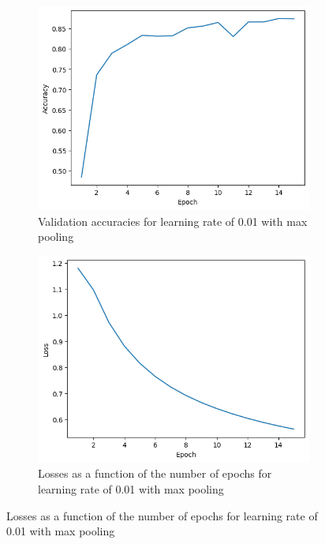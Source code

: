 \documentclass[11pt]{article}
\begin{document}
\begin{figure}[H]
    \hspace{0.025\linewidth}
    \begin{subfigure}{0.45\linewidth}
        \centering
        \includegraphics[width=\linewidth]{../data/q2/1/0.01.acc.png}
        \caption{Validation accuracies for learning rate of 0.01 with max pooling}
    \end{subfigure}
    \hspace{0.05\linewidth}
    \begin{subfigure}{0.45\linewidth}
        \centering
        \includegraphics[width=\linewidth]{../data/q2/1/0.01.loss.png}
        \caption{Losses as a function of the number of epochs for learning rate of 0.01 with max pooling}
    \end{subfigure}
\end{figure}
\end{document}
